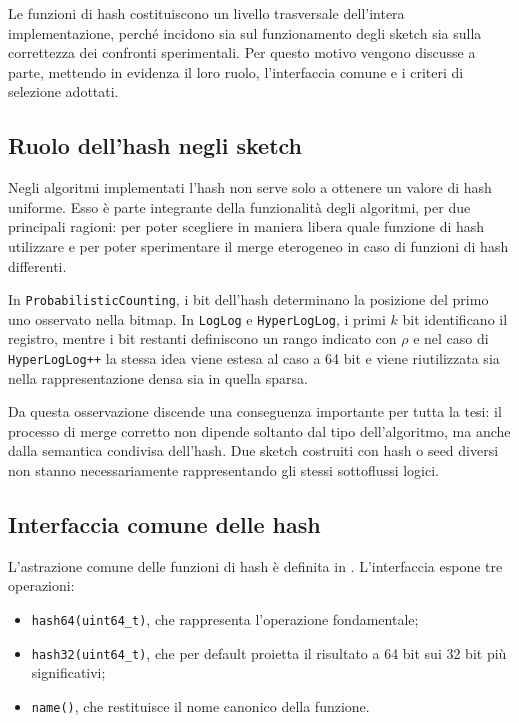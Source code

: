 Le funzioni di hash costituiscono un livello trasversale dell'intera
implementazione, perché incidono sia sul funzionamento degli sketch sia sulla
correttezza dei confronti sperimentali. Per questo motivo vengono discusse a
parte, mettendo in evidenza il loro ruolo, l'interfaccia comune e i criteri di
selezione adottati.

\subsection{Ruolo dell'hash negli sketch}

Negli algoritmi implementati l'hash non serve solo a ottenere un valore di hash uniforme. 
Esso è parte integrante della funzionalit\`a degli algoritmi, per due principali ragioni: per poter
scegliere in maniera libera quale funzione di hash utilizzare e per poter sperimentare 
il merge eterogeneo in caso di funzioni di hash differenti.

In \texttt{ProbabilisticCounting}, i bit dell'hash determinano la posizione del
primo uno osservato nella bitmap. In \texttt{LogLog} e \texttt{HyperLogLog}, i
primi \(k\) bit identificano il registro, mentre i bit restanti definiscono un
rango indicato con \(\rho\) e nel caso di \texttt{HyperLogLog++} la stessa idea
viene estesa al caso a 64 bit e viene riutilizzata sia nella rappresentazione
densa sia in quella sparsa.

Da questa osservazione discende una conseguenza importante per tutta la tesi: il
processo di merge corretto non dipende soltanto dal tipo dell'algoritmo, ma anche dalla
semantica condivisa dell'hash. Due sketch costruiti con hash o seed diversi non
stanno necessariamente rappresentando gli stessi sottoflussi logici.

\subsection{Interfaccia comune delle hash}

L'astrazione comune delle funzioni di hash è definita in
. L'interfaccia espone tre operazioni:
\begin{itemize}
    \item \texttt{hash64(uint64\_t)}, che rappresenta l'operazione fondamentale;
    \item \texttt{hash32(uint64\_t)}, che per default proietta il risultato a
    64 bit sui 32 bit più significativi;
    \item \texttt{name()}, che restituisce il nome canonico della funzione.
\end{itemize}

